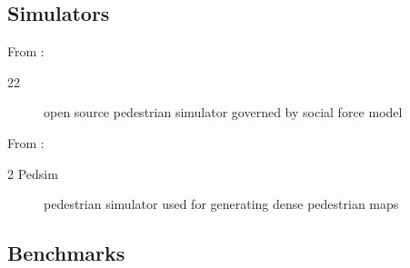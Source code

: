 \subsection{Simulators}

From \cite{okal2016learning}:
\begin{description}
	\item[22 ] open source pedestrian simulator governed by social force model
\end{description}

From \cite{kiss2021probabilistic}:
\begin{description}
	\item[2 Pedsim] pedestrian simulator used for generating dense pedestrian maps
\end{description}

\subsection{Benchmarks}

